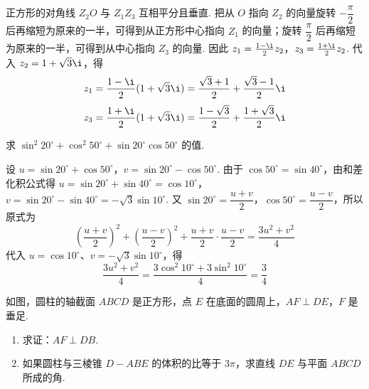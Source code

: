 \begin{solution}
正方形的对角线 \(Z_2O\) 与 \(Z_1Z_3\) 互相平分且垂直. 把从 \(O\) 指向 \(Z_2\) 的向量旋转 \(-\dfrac{\pi}{2}\) 后再缩短为原来的一半，可得到从正方形中心指向 \(Z_1\) 的向量；旋转 \(\dfrac{\pi}{2}\) 后再缩短为原来的一半，可得到从中心指向 \(Z_3\) 的向量. 因此
\(z_1=\frac{1-\i}{2}z_2\)，\(z_3=\frac{1+\i}{2}z_2\).
代入 \(z_2=1+\sqrt3\i\)，得
\[
z_1=\frac{1-\i}{2}(1+\sqrt3\i)
=\frac{\sqrt3+1}{2}+\frac{\sqrt3-1}{2}\i
\]
\[
z_3=\frac{1+\i}{2}(1+\sqrt3\i)
=\frac{1-\sqrt3}{2}+\frac{1+\sqrt3}{2}\i
\]
\end{solution}

\begin{problem}
求 \(\sin^2 20^\circ + \cos^2 50^\circ + \sin 20^\circ \cos 50^\circ\) 的值.
\end{problem}

\begin{solution}
设
\(u=\sin20^\circ+\cos50^\circ\)，\(v=\sin20^\circ-\cos50^\circ\).
由于 \(\cos50^\circ=\sin40^\circ\)，由和差化积公式得
\(u=\sin20^\circ+\sin40^\circ=\cos10^\circ\)，\(v=\sin20^\circ-\sin40^\circ=-\sqrt3\sin10^\circ\).
又 \(\sin20^\circ=\dfrac{u+v}{2}\)，\(\cos50^\circ=\dfrac{u-v}{2}\)，所以原式为
\[
\left(\frac{u+v}{2}\right)^2+\left(\frac{u-v}{2}\right)^2
+\frac{u+v}{2}\cdot\frac{u-v}{2}
=\frac{3u^2+v^2}{4}
\]
代入 \(u=\cos10^\circ\)、\(v=-\sqrt3\sin10^\circ\)，得
\[
\frac{3u^2+v^2}{4}
=\frac{3\cos^2 10^\circ+3\sin^2 10^\circ}{4}
=\frac34
\]
\end{solution}

\begin{problem}
如图，圆柱的轴截面 \(ABCD\) 是正方形，点 \(E\) 在底面的圆周上，\(AF \perp DE\)，\(F\) 是垂足.

\begin{enumerate}
\item 求证：\(AF \perp DB\).

\item 如果圆柱与三棱锥 \(D - ABE\) 的体积的比等于 \(3\pi\)，求直线 \(DE\) 与平面 \(ABCD\) 所成的角.
\end{enumerate}

\end{problem}

